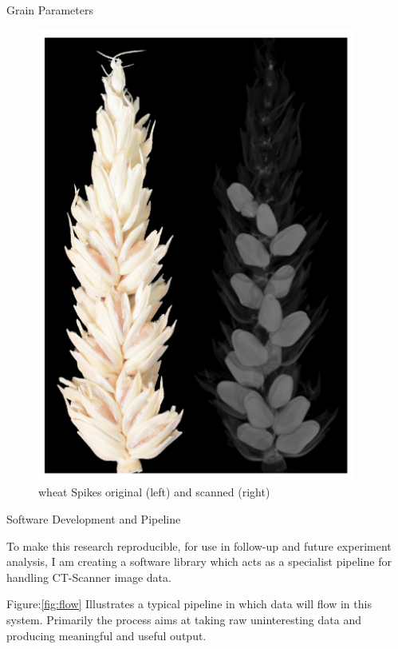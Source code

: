 \documentclass[final]{beamer}
\begin{document}
\begin{frame}{}
\begin{textblock}{28}
\begin{block}{Grain Parameters}
\begin{multicols}{2}
        \begin{figure}[htb]
          \centering
          \includegraphics[width=10.5cm]{collection.png}
          \caption{\label{fig:3d} wheat Spikes original (left) and scanned (right)}
        \end{figure}        
        
      \end{multicols}
      
    \end{block}

    \begin{block}{Software Development and Pipeline}
      \begin{multicols}{2}
        
      To make this research reproducible, for use in follow-up and future experiment analysis,
      I am creating a software library which acts as a specialist pipeline for handling CT-Scanner
      image data.

      \vspace{0.5cm}

      Figure:\ref{fig:flow} Illustrates a typical pipeline in which data will flow in this system.
      Primarily the process aims at taking raw uninteresting data and producing meaningful and useful
      output.


\end{multicols}
\end{block}
\end{textblock}
\end{frame}
\end{document}
